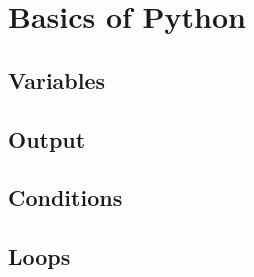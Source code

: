 \section{Basics of Python}

\subsection{Variables}


\subsection{Output}


\subsection{Conditions}


\subsection{Loops}


